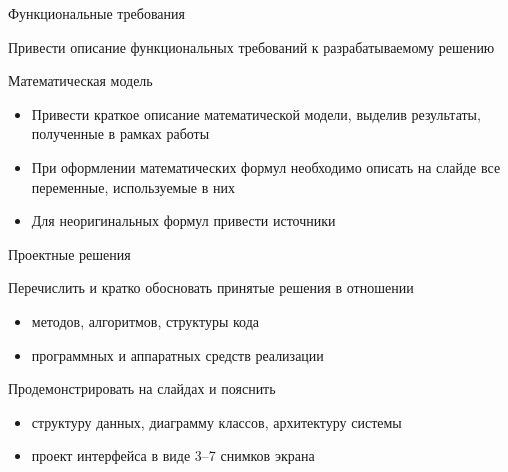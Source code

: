 \documentclass{../cls/fefu_presentation}
\begin{document}
    \note{}

    \begin{frame}{Функциональные требования}
        \begin{block}{}
            Привести описание функциональных требований к разрабатываемому решению
        \end{block}
    \end{frame}

    \note{}

    \begin{frame}{Математическая модель}
        \begin{block}{}
            \begin{itemize}
                \item Привести краткое описание математической модели, выделив результаты, полученные в рамках работы
                \item При оформлении математических формул необходимо описать на слайде все переменные, используемые в них
                \item Для неоригинальных формул привести источники
            \end{itemize}
        \end{block}
    \end{frame}

    \note{}

    \begin{frame}{Проектные решения}
        \begin{block}{}
            Перечислить и кратко обосновать принятые решения в отношении
            \begin{itemize}
                \item методов, алгоритмов, структуры кода
                \item программных и аппаратных средств реализации
            \end{itemize}
        \end{block}
        \begin{block}{}
            Продемонстрировать на слайдах и пояснить
            \begin{itemize}
                \item структуру данных, диаграмму классов, архитектуру системы
                \item проект интерфейса в виде 3--7 снимков экрана
            \end{itemize}
        \end{block}
    \end{frame}
\end{document}

